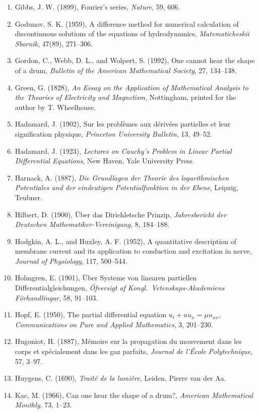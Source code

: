 \documentclass[11pt,a4paper]{article}
\numberwithin{equation}{section}
\theoremstyle{definition}
\begin{document}
\begin{enumerate}
\item Gibbs, J. W. (1899), Fourier's series, \emph{Nature}, 59, 606.
\item Godunov, S. K. (1959), A difference method for numerical calculation of discontinuous solutions of the equations of hydrodynamics, \emph{Matematicheskii Sbornik}, 47(89), 271--306.
\item Gordon, C., Webb, D. L., and Wolpert, S. (1992), One cannot hear the shape of a drum, \emph{Bulletin of the American Mathematical Society}, 27, 134--138.
\item Green, G. (1828), \emph{An Essay on the Application of Mathematical Analysis to the Theories of Electricity and Magnetism}, Nottingham, printed for the author by T. Wheelhouse.
\item Hadamard, J. (1902), Sur les probl\`emes aux d\'eriv\'ees partielles et leur signification physique, \emph{Princeton University Bulletin}, 13,
49--52.
\item Hadamard, J. (1923), \emph{Lectures on Cauchy's Problem in Linear Partial Differential Equations}, New Haven, Yale University Press.
\item Harnack, A. (1887), \emph{Die Grundlagen der Theorie des logarithmischen Potentiales und der eindeutigen Potentialfunktion in der Ebene}, Leipzig, Teubner.
\item Hilbert, D. (1900), \"Uber das Dirichletsche Prinzip, \emph{Jahresbericht der Deutschen Mathematiker-Vereinigung}, 8, 184--188.
\item Hodgkin, A. L., and Huxley, A. F. (1952), A quantitative description of membrane current and its application to conduction and excitation in nerve, \emph{Journal of Physiology}, 117, 500--544.
\item Holmgren, E. (1901), \"Uber Systeme von linearen partiellen Differentialgleichungen, \emph{\"Ofversigt af Kongl.\ Vetenskaps-Akademiens F\"orhandlingar}, 58, 91--103.
\item Hopf, E. (1950), The partial differential equation $u_t + uu_x = \mu u_{xx}$, \emph{Communications on Pure and Applied Mathematics}, 3, 201--230.
\item Hugoniot, H. (1887), M\'emoire sur la propagation du mouvement dans les corps et sp\'ecialement dans les gaz parfaits, \emph{Journal de l'\'Ecole Polytechnique}, 57, 3--97.
\item Huygens, C. (1690), \emph{Trait\'e de la lumi\`ere}, Leiden, Pierre van der Aa.
\item Kac, M. (1966), Can one hear the shape of a drum?, \emph{American Mathematical Monthly}, 73, 1--23.

\end{enumerate}
\end{document}
